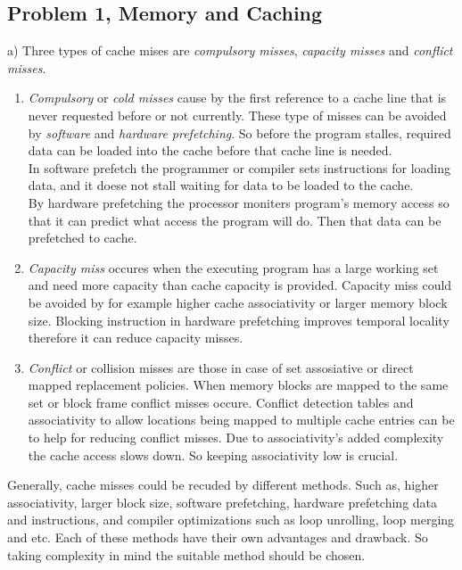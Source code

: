 \documentclass{article}
\begin{document}
\subsection{Problem 1, Memory and Caching}
\begin{flushleft}
a) Three types of cache mises are \textit{compulsory misses}, \textit{capacity misses} and \textit{conflict misses}.
\begin{enumerate}
\item \textit{Compulsory} or \textit{cold misses} cause by the first reference to a cache line that is never requested before or not currently. These type of misses can be avoided by \textit{software} and \textit{hardware prefetching}. So before the program stalles, required data can be loaded into the cache before that cache line is needed. \\
In software prefetch the programmer or compiler sets instructions for loading data, and it doese not stall waiting for data to be loaded to the cache.\\
By hardware prefetching the processor moniters program's memory access so that it can predict what access the program will do. Then that data can be prefetched to cache. 
\item \textit{Capacity miss} occures when the executing program has a large working set and need more capacity than cache capacity is provided. Capacity miss could be avoided by for example higher cache associativity or larger memory block size. Blocking instruction in hardware prefetching improves temporal locality therefore it can reduce capacity misses.
\item \textit{Conflict} or {collision misses} are those in case of set assosiative or direct mapped replacement policies. When memory blocks are mapped to the same set or block frame conflict misses occure. Conflict detection tables and associativity to allow locations being mapped to multiple cache entries can be to help for reducing conflict misses. Due to associativity's added complexity the cache access slows down. So keeping associativity low is crucial.
\end{enumerate}
Generally, cache misses could be recuded by different methods. Such as, higher associativity, larger block size, software prefetching, hardware prefetching data and instructions, and compiler optimizations such as loop unrolling, loop merging and etc. Each of these methods have their own advantages and drawback. So taking complexity in mind the suitable method should be chosen.

\end{flushleft}
\end{document}
